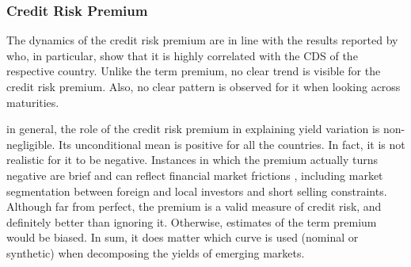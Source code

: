 {%


\subsubsection{Credit Risk Premium}
\iftoggle{toclinks}{\gototoc}{} %

The dynamics of the credit risk premium are in line with the results reported by \cite{DuSchreger:2016JoF} who, in particular, show that it is highly correlated with the CDS of the respective country.
Unlike the term premium, no clear trend is visible for the credit risk premium.
Also, no clear pattern is observed for it when looking across maturities.

in general, the role of the credit risk premium in explaining yield variation is non-negligible.
Its unconditional mean is positive for all the countries. 
In fact, it is not realistic for it to be negative. 
Instances in which the premium actually turns negative are brief and can reflect financial market frictions \citep{DuSchreger:2016JoF}, including market segmentation between foreign and local investors and short selling constraints.
Although far from perfect, the premium is a valid measure of credit risk, and definitely better than ignoring it. 
Otherwise, estimates of the term premium would be biased.
In sum, it does matter which curve is used (nominal or synthetic) when decomposing the yields of emerging markets. 

}
